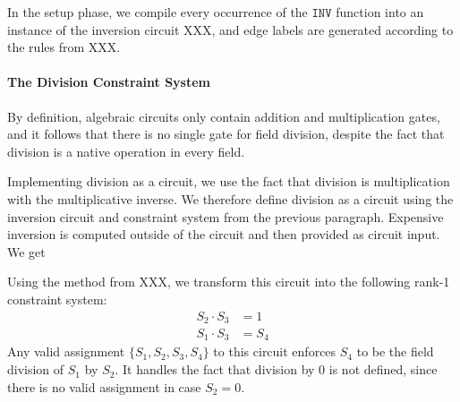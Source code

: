 In the setup phase, we compile every occurrence of the $\mathtt{INV}$ function into an instance of the inversion circuit XXX, and edge labels are generated according to the rules from XXX.
\paragraph{The Division Constraint System} By definition, algebraic circuits only contain addition and multiplication gates, and it follows that there is no single gate for field division, despite the fact that division is a native operation in every field.

Implementing division as a circuit, we use the fact that division is multiplication with the multiplicative inverse. We therefore define division as a circuit using the inversion circuit and constraint system from the previous paragraph. Expensive inversion is computed outside of the circuit and then provided as circuit input. We get 
\begin{center}
\end{center} 
Using the method from XXX, we transform this circuit into the following rank-1 constraint system:
\begin{align*}
S_2 \cdot S_3 &= 1\\
S_1 \cdot S_3 &= S_4
\end{align*}
Any valid assignment $\{S_1,S_2,S_3,S_4\}$ to this circuit enforces $S_4$ to be the field division of $S_1$ by $S_2$. It handles the fact that division by $0$ is not defined, since there is no valid assignment in case $S_2=0$. 


